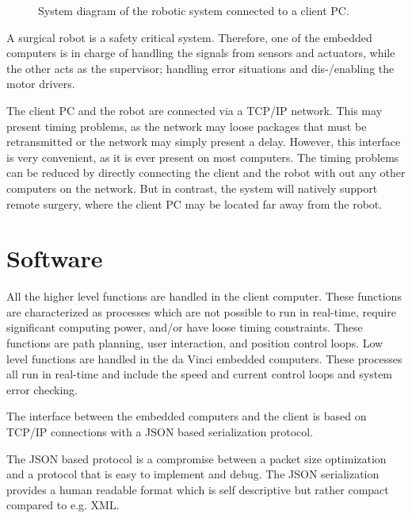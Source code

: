 \documentclass[a4paper, 11 pt, conference]{IEEEtran}  %
\begin{document}
\begin{figure}
\def\svgwidth{0.85\columnwidth}

\caption{System diagram of the robotic system connected to a client PC.}
\end{figure}

A surgical robot is a safety critical system.
Therefore, one of the embedded computers is in charge of handling the signals from sensors and actuators, while the other acts as the supervisor; handling error situations and dis-/enabling the motor drivers.

The client PC and the robot are connected via a TCP/IP network.
This may present timing problems, as the network may loose packages that must be retransmitted or the network may simply present a delay.
However, this interface is very convenient, as it is ever present on most computers.
The timing problems can be reduced by directly connecting the client and the robot with out any other computers on the network.
But in contrast, the system will natively support remote surgery, where the client PC may be located far away from the robot.


\section{Software}\label{sec:software}
All the higher level functions are handled in the client computer.
These functions are characterized as processes which are not possible to run in real-time, require significant computing power, and/or have loose timing constraints.
These functions are path planning, user interaction, and position control loops.
Low level functions are handled in the da Vinci embedded computers.
These processes all run in real-time and include the speed and current control loops and system error checking.

The interface between the embedded computers and the client is based on TCP/IP connections with a JSON based serialization protocol.

The JSON based protocol is a compromise between a packet size optimization and a protocol that is easy to implement and debug.
The JSON serialization \cite{ecma404} provides a human readable format which is self descriptive but rather compact compared to e.g. XML.
\end{document}
